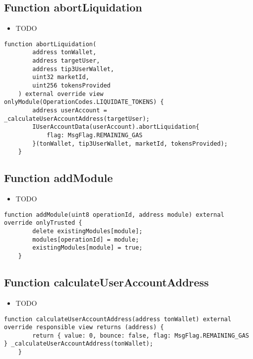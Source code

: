 \subsection{Function abortLiquidation}

\noindent\begin{itemize}
\item TODO
\end{itemize}

\begin{lstlisting}[firstnumber=386]
    function abortLiquidation(
        address tonWallet, 
        address targetUser, 
        address tip3UserWallet, 
        uint32 marketId, 
        uint256 tokensProvided
    ) external override view onlyModule(OperationCodes.LIQUIDATE_TOKENS) {
        address userAccount = _calculateUserAccountAddress(targetUser);
        IUserAccountData(userAccount).abortLiquidation{
            flag: MsgFlag.REMAINING_GAS
        }(tonWallet, tip3UserWallet, marketId, tokensProvided);
    }
\end{lstlisting}

\subsection{Function addModule}

\noindent\begin{itemize}
\item TODO
\end{itemize}

\begin{lstlisting}[firstnumber=543]
    function addModule(uint8 operationId, address module) external override onlyTrusted {
        delete existingModules[module];
        modules[operationId] = module;
        existingModules[module] = true;
    }
\end{lstlisting}

\subsection{Function calculateUserAccountAddress}

\noindent\begin{itemize}
\item TODO
\end{itemize}

\begin{lstlisting}[firstnumber=123]
    function calculateUserAccountAddress(address tonWallet) external override responsible view returns (address) {
        return { value: 0, bounce: false, flag: MsgFlag.REMAINING_GAS } _calculateUserAccountAddress(tonWallet);
    }
\end{lstlisting}

